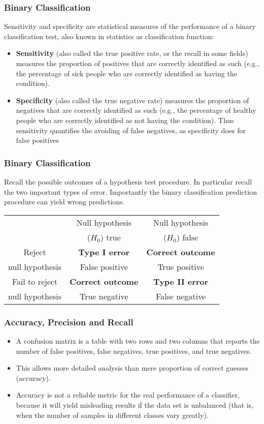 \documentclass[a4]{beamer}
\begin{document}
\begin{frame}	\frametitle{Binary Classification}
	\large
Sensitivity and specificity are statistical measures of the performance of a binary classification test, also known in statistics as classification function:

\begin{itemize}
\item \textbf{Sensitivity} (also called the true positive rate, or the recall in some fields) measures the proportion of positives that are correctly identified as such (e.g., the percentage of sick people who are correctly identified as having the condition).
\item \textbf{Specificity} (also called the true negative rate) measures the proportion of negatives that are correctly identified as such (e.g., the percentage of healthy people who are correctly identified as not having the condition).
Thus sensitivity quantifies the avoiding of false negatives, as specificity does for false positives
\end{itemize}
\end{frame}
\begin{frame}
	\frametitle{Binary Classification}
	\large
	Recall the possible outcomes of a hypothesis test procedure. In particular recall the two important types of error. Importantly the binary classification prediction procedure can yield wrong predictions.
	\begin{center}
		\begin{tabular}{|c|c|c|} \hline
			& Null hypothesis & Null hypothesis   \\
			& ($H_0$) true	 & ($H_0$) false \\ \hline
			Reject 	       & \textbf{Type I error }   & \textbf{Correct outcome} \\
			null hypothesis& False positive  & True positive \\ \hline
			Fail to reject & \textbf{Correct outcome} & \textbf{Type II error} \\
			null hypothesis & True negative  & False negative \\ \hline
		\end{tabular} 
	\end{center}
\end{frame}
\begin{frame}
	\frametitle{Accuracy, Precision and Recall}
	\large
	\begin{itemize}
	\item A confusion matrix is a table with two rows and two columns that reports the number of false positives, false negatives, true positives, and true negatives. \item This allows more detailed analysis than mere proportion of correct guesses (accuracy). \item Accuracy is not a reliable metric for the real performance of a classifier, because it will yield misleading results if the data set is unbalanced (that is, when the number of samples in different classes vary greatly).
	\end{itemize}

\end{frame}
\end{document}
